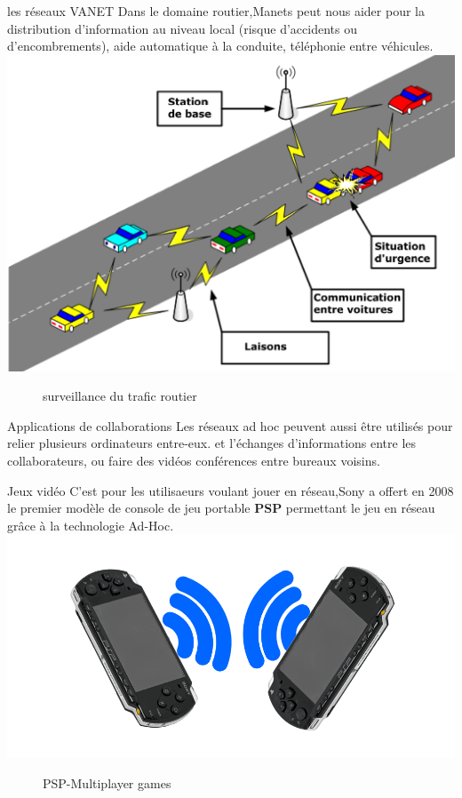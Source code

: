 \documentclass[11pt]{beamer}
\begin{document}
\begin{frame}
\begin{exampleblock}{les réseaux VANET}
Dans le domaine routier,Manets peut nous aider pour la distribution d’information au niveau local (risque d’accidents ou d’encombrements), aide automatique à la conduite, téléphonie entre véhicules.\\
\centering
\includegraphics[scale=0.3]{Vanet.png}
\begin{figure}
\caption{surveillance du trafic routier }
\end{figure} 
\end{exampleblock}
\end{frame}
\begin{frame}
\begin{exampleblock}{Applications de collaborations}
Les réseaux ad hoc peuvent aussi être utilisés pour relier plusieurs ordinateurs entre-eux. et l'échanges d'informations entre les collaborateurs, ou faire des vidéos conférences entre bureaux voisins.
\end{exampleblock}
\begin{exampleblock}{Jeux vidéo}
C'est pour les utilisaeurs voulant jouer en réseau,Sony a offert en 2008 le premier modèle de console de jeu portable \textbf{PSP} permettant le jeu en réseau grâce à la technologie Ad-Hoc.\\
\centering
\includegraphics[scale=0.13]{img1.PNG}
\begin{figure}
\caption{PSP-Multiplayer games}
\end{figure}
\end{exampleblock}
\end{frame}
\end{document}
